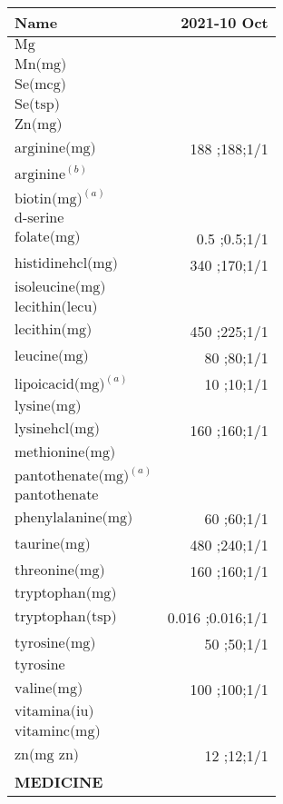 \begin{table}[H]
\centering
\begin{tabular}{|l|r|}
\hline
Name&2021-10 Oct\\
\hline
$\textrm{Mg}$&\\
$\textrm{Mn(mg)}$&\\
$\textrm{Se(mcg)}$&\\
$\textrm{Se(tsp)}$&\\
$\textrm{Zn(mg)}$&\\
$\textrm{arginine(mg)}$&188 ;188;1/1\\
$\textrm{arginine}^{\left(b\right)}$&\\
$\textrm{biotin(mg)}^{\left(a\right)}$&\\
$\textrm{d-serine}$&\\
$\textrm{folate(mg)}$&0.5 ;0.5;1/1\\
$\textrm{histidinehcl(mg)}$&340 ;170;1/1\\
$\textrm{isoleucine(mg)}$&\\
$\textrm{lecithin(lecu)}$&\\
$\textrm{lecithin(mg)}$&450 ;225;1/1\\
$\textrm{leucine(mg)}$&80 ;80;1/1\\
$\textrm{lipoicacid(mg)}^{\left(a\right)}$&10 ;10;1/1\\
$\textrm{lysine(mg)}$&\\
$\textrm{lysinehcl(mg)}$&160 ;160;1/1\\
$\textrm{methionine(mg)}$&\\
$\textrm{pantothenate(mg)}^{\left(a\right)}$&\\
$\textrm{pantothenate}$&\\
$\textrm{phenylalanine(mg)}$&60 ;60;1/1\\
$\textrm{taurine(mg)}$&480 ;240;1/1\\
$\textrm{threonine(mg)}$&160 ;160;1/1\\
$\textrm{tryptophan(mg)}$&\\
$\textrm{tryptophan(tsp)}$&0.016 ;0.016;1/1\\
$\textrm{tyrosine(mg)}$&50 ;50;1/1\\
$\textrm{tyrosine}$&\\
$\textrm{valine(mg)}$&100 ;100;1/1\\
$\textrm{vitamina(iu)}$&\\
$\textrm{vitaminc(mg)}$&\\
$\textrm{zn(mg~zn)}$&12 ;12;1/1\\
{\bf MEDICINE}&\\

\end{tabular}
\end{table}
